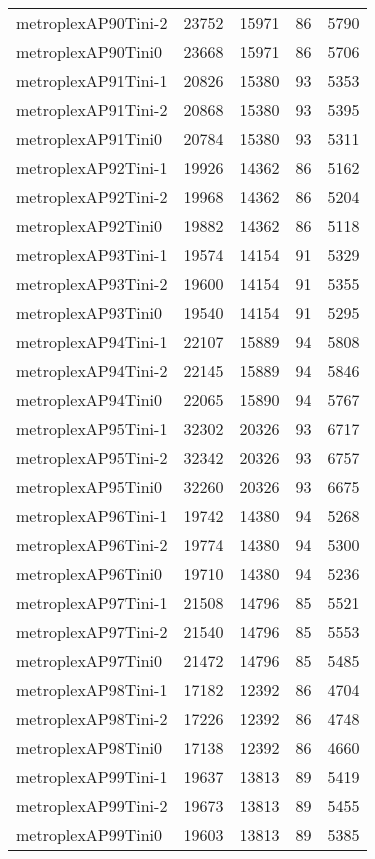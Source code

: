 \begin{tabular}{lrrrr}
metroplexAP90Tini-2 & 23752 & 15971 & 86 & 5790 \\
metroplexAP90Tini0 & 23668 & 15971 & 86 & 5706 \\
metroplexAP91Tini-1 & 20826 & 15380 & 93 & 5353 \\
metroplexAP91Tini-2 & 20868 & 15380 & 93 & 5395 \\
metroplexAP91Tini0 & 20784 & 15380 & 93 & 5311 \\
metroplexAP92Tini-1 & 19926 & 14362 & 86 & 5162 \\
metroplexAP92Tini-2 & 19968 & 14362 & 86 & 5204 \\
metroplexAP92Tini0 & 19882 & 14362 & 86 & 5118 \\
metroplexAP93Tini-1 & 19574 & 14154 & 91 & 5329 \\
metroplexAP93Tini-2 & 19600 & 14154 & 91 & 5355 \\
metroplexAP93Tini0 & 19540 & 14154 & 91 & 5295 \\
metroplexAP94Tini-1 & 22107 & 15889 & 94 & 5808 \\
metroplexAP94Tini-2 & 22145 & 15889 & 94 & 5846 \\
metroplexAP94Tini0 & 22065 & 15890 & 94 & 5767 \\
metroplexAP95Tini-1 & 32302 & 20326 & 93 & 6717 \\
metroplexAP95Tini-2 & 32342 & 20326 & 93 & 6757 \\
metroplexAP95Tini0 & 32260 & 20326 & 93 & 6675 \\
metroplexAP96Tini-1 & 19742 & 14380 & 94 & 5268 \\
metroplexAP96Tini-2 & 19774 & 14380 & 94 & 5300 \\
metroplexAP96Tini0 & 19710 & 14380 & 94 & 5236 \\
metroplexAP97Tini-1 & 21508 & 14796 & 85 & 5521 \\
metroplexAP97Tini-2 & 21540 & 14796 & 85 & 5553 \\
metroplexAP97Tini0 & 21472 & 14796 & 85 & 5485 \\
metroplexAP98Tini-1 & 17182 & 12392 & 86 & 4704 \\
metroplexAP98Tini-2 & 17226 & 12392 & 86 & 4748 \\
metroplexAP98Tini0 & 17138 & 12392 & 86 & 4660 \\
metroplexAP99Tini-1 & 19637 & 13813 & 89 & 5419 \\
metroplexAP99Tini-2 & 19673 & 13813 & 89 & 5455 \\
metroplexAP99Tini0 & 19603 & 13813 & 89 & 5385 \\

\end{tabular}
